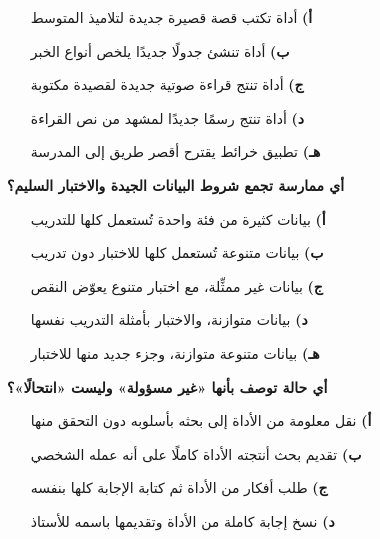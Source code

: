 \documentclass[11pt,a4paper]{article}
\begin{document}
\begin{multicols}{2}
\begin{minipage}{\linewidth}
\begin{itemize}[leftmargin=0.95cm, labelsep=4pt, itemsep=0pt, topsep=2pt, parsep=0pt]
  \item[\textbf{أ)}] أداة تكتب قصة قصيرة جديدة لتلاميذ المتوسط
  \item[\textbf{ب)}] أداة تنشئ جدولًا جديدًا يلخص أنواع الخبر
  \item[\textbf{ج)}] أداة تنتج قراءة صوتية جديدة لقصيدة مكتوبة
  \item[\textbf{د)}] أداة تنتج رسمًا جديدًا لمشهد من نص القراءة
  \item[\textbf{هـ)}] تطبيق خرائط يقترح أقصر طريق إلى المدرسة
\end{itemize}
\end{minipage}\par\vspace{7pt plus 4pt}
\noindent\begin{minipage}{\linewidth}
\hangindent=0.7cm\textbf{أي ممارسة تجمع شروط البيانات الجيدة والاختبار السليم؟}
\begin{itemize}[leftmargin=0.95cm, labelsep=4pt, itemsep=0pt, topsep=2pt, parsep=0pt]
  \item[\textbf{أ)}] بيانات كثيرة من فئة واحدة تُستعمل كلها للتدريب
  \item[\textbf{ب)}] بيانات متنوعة تُستعمل كلها للاختبار دون تدريب
  \item[\textbf{ج)}] بيانات غير ممثِّلة، مع اختبار متنوع يعوّض النقص
  \item[\textbf{د)}] بيانات متوازنة، والاختبار بأمثلة التدريب نفسها
  \item[\textbf{هـ)}] بيانات متنوعة متوازنة، وجزء جديد منها للاختبار
\end{itemize}
\end{minipage}\par\vspace{7pt plus 4pt}
\noindent\begin{minipage}{\linewidth}
\hangindent=0.7cm\textbf{أي حالة توصف بأنها «غير مسؤولة» وليست «انتحالًا»؟}
\begin{itemize}[leftmargin=0.95cm, labelsep=4pt, itemsep=0pt, topsep=2pt, parsep=0pt]
  \item[\textbf{أ)}] نقل معلومة من الأداة إلى بحثه بأسلوبه دون التحقق منها
  \item[\textbf{ب)}] تقديم بحث أنتجته الأداة كاملًا على أنه عمله الشخصي
  \item[\textbf{ج)}] طلب أفكار من الأداة ثم كتابة الإجابة كلها بنفسه
  \item[\textbf{د)}] نسخ إجابة كاملة من الأداة وتقديمها باسمه للأستاذ

\end{itemize}
\end{minipage}
\end{multicols}
\end{document}
